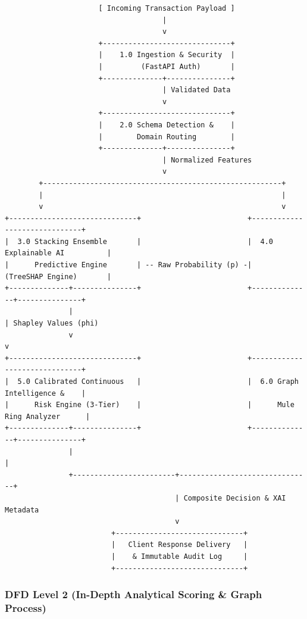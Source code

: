 \documentclass[12pt,a4paper,oneside]{report}
\begin{document}
\begin{lstlisting}
                      [ Incoming Transaction Payload ]
                                     |
                                     v
                      +------------------------------+
                      |    1.0 Ingestion & Security  |
                      |         (FastAPI Auth)       |
                      +--------------+---------------+
                                     | Validated Data
                                     v
                      +------------------------------+
                      |    2.0 Schema Detection &    |
                      |        Domain Routing        |
                      +--------------+---------------+
                                     | Normalized Features
                                     v
        +--------------------------------------------------------+
        |                                                        |
        v                                                        v
+------------------------------+                         +------------------------------+
|  3.0 Stacking Ensemble       |                         |  4.0 Explainable AI          |
|      Predictive Engine       | -- Raw Probability (p) -|      (TreeSHAP Engine)       |
+--------------+---------------+                         +--------------+---------------+
               |                                                        | Shapley Values (phi)
               v                                                        v
+------------------------------+                         +------------------------------+
|  5.0 Calibrated Continuous   |                         |  6.0 Graph Intelligence &    |
|      Risk Engine (3-Tier)    |                         |      Mule Ring Analyzer      |
+--------------+---------------+                         +--------------+---------------+
               |                                                        |
               +------------------------+-------------------------------+
                                        | Composite Decision & XAI Metadata
                                        v
                         +------------------------------+
                         |   Client Response Delivery   |
                         |    & Immutable Audit Log     |
                         +------------------------------+
\end{lstlisting}

\subsubsection{DFD Level 2 (In-Depth Analytical Scoring \& Graph Process)}
\end{document}
